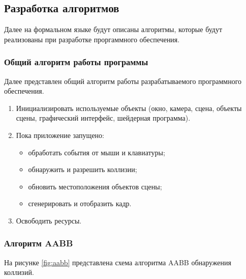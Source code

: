 \subsection{Разработка алгоритмов}

Далее на формальном языке будут описаны алгоритмы, которые будут реализованы при разработке проргаммного обеспечения.

\subsubsection{Общий алгоритм работы программы}

Далее представлен общий алгоритм работы разрабатываемого программного обеспечения.

\begin{enumerate}
    \item Инициализировать используемые объекты (окно, камера, сцена, объекты сцены, графический интерфейс, шейдерная программа).
    \item Пока приложение запущено:
        \begin{itemize}
            \item обработать события от мыши и клавиатуры;
            \item обнаружить и разрешить коллизии;
            \item обновить местоположения объектов сцены;
            \item сгенерировать и отобразить кадр.
        \end{itemize}
    \item Освободить ресурсы.
\end{enumerate}


\subsubsection{Алгоритм AABB}

На рисунке \ref{fig:aabb} представлена схема алгоритма AABB обнаружения коллизий.

